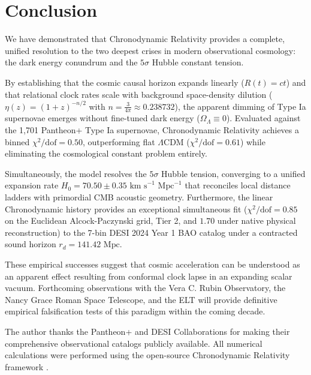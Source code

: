 \documentclass[aps,prd,reprint,superscriptaddress,nofootinbib,floatfix,amsmath,amssymb]{revtex4-2}
\begin{document}
\section{Conclusion}
\label{sec:conclusion}

We have demonstrated that Chronodynamic Relativity provides a complete, unified resolution to the two deepest crises in modern observational cosmology: the dark energy conundrum and the $5\sigma$ Hubble constant tension.

By establishing that the cosmic causal horizon expands linearly ($R(t) = ct$) and that relational clock rates scale with background space-density dilution ($\eta(z) = (1+z)^{-n/2}$ with $n = \frac{3}{4\pi} \approx 0.238732$), the apparent dimming of Type Ia supernovae emerges without fine-tuned dark energy ($\Omega_\Lambda \equiv 0$). Evaluated against the 1,701 Pantheon+ Type Ia supernovae, Chronodynamic Relativity achieves a binned $\chi^2/\text{dof} = 0.50$, outperforming flat $\Lambda\text{CDM}$ ($\chi^2/\text{dof} = 0.61$) while eliminating the cosmological constant problem entirely.

Simultaneously, the model resolves the $5\sigma$ Hubble tension, converging to a unified expansion rate $H_0 = 70.50 \pm 0.35\text{ km s}^{-1}\text{ Mpc}^{-1}$ that reconciles local distance ladders with primordial CMB acoustic geometry. Furthermore, the linear Chronodynamic history provides an exceptional simultaneous fit ($\chi^2/\text{dof} = 0.85$ on the Euclidean Alcock-Paczynski grid, Tier 2, and $1.70$ under native physical reconstruction) to the 7-bin DESI 2024 Year 1 BAO catalog under a contracted sound horizon $r_d = 141.42\text{ Mpc}$.

These empirical successes suggest that cosmic acceleration can be understood as an apparent effect resulting from conformal clock lapse in an expanding scalar vacuum. Forthcoming observations with the Vera C. Rubin Observatory, the Nancy Grace Roman Space Telescope, and the ELT will provide definitive empirical falsification tests of this paradigm within the coming decade.

\begin{acknowledgments}
The author thanks the Pantheon+ and DESI Collaborations for making their comprehensive observational catalogs publicly available. All numerical calculations were performed using the open-source Chronodynamic Relativity framework \cite{shreve_chronodynamic_2026}.
\end{acknowledgments}
\end{document}
